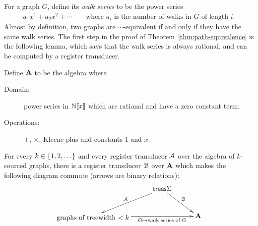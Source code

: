 For a graph $G$, define its \emph{walk series} to be the power series 
\begin{align*}
  a_1 x^1 + a_2x^2 + \cdots \qquad \text{where $a_i$ is the number of walks in $G$ of length $i$.}
\end{align*}
Almost by definition, two graphs are $\sim$-equivalent if and only if they have the same walk series. 
The first step in the proof of Theorem~\ref{thm:path-equivalence} is the following lemma, which says  that the walk series is always  rational, and can be computed by a register transducer.
\begin{lemma}\label{lem:compute-power-series}    
    Define  $\mathbf{A}$ to be the  algebra where
    \begin{description}
        \item[Domain:]power series in $\mathbb N [\![x]\!]$ which are rational and have a  zero constant term;
        \item[Operations:] $+$, $\times$, Kleene plus and constants $1$ and $x$.
    \end{description}
    For every $k \in \{1,2,\ldots\}$ and every register transducer ${{\mathcal A}}$ over the algebra of $k$-sourced graphs, there is a  register transducer ${\mathcal B}$ over $\mathbf{A}$ which makes the following diagram commute (arrows are binary relations):
    \begin{align*}
    \xymatrix@C=1cm{
       &  \trees \Sigma   
        \ar[dr]^{\Bb}
        \ar[dl]_{\Aa} \\
        \txt{graphs of
        treewidth $< k$} \ar[rr]_-{G \mapsto \text{walk series of $G$}}& & \aalg
    }
    \end{align*}
\end{lemma}
